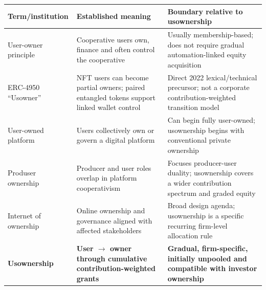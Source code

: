 \begin{tabularx}{\linewidth}{@{}p{.20\linewidth}p{.28\linewidth}X@{}}
\toprule
Term/institution & Established meaning & Boundary relative to usownership \\
\midrule
User-owner principle & Cooperative users own, finance and often control the cooperative \citep{dunn1988} & Usually membership-based; does not require gradual automation-linked equity acquisition \\
ERC-4950 ``Usowner'' & NFT users can become partial owners; paired entangled tokens support linked wallet control \citep{erc4950} & Direct 2022 lexical/technical precursor; not a corporate contribution-weighted transition model \\
User-owned platform & Users collectively own or govern a digital platform & Can begin fully user-owned; usownership begins with conventional private ownership \\
Produser ownership & Producer and user roles overlap in platform cooperativism \citep{scholz2016} & Focuses producer-user duality; usownership covers a wider contribution spectrum and graded equity \\
Internet of ownership & Online ownership and governance aligned with affected stakeholders \citep{schneider2018} & Broad design agenda; usownership is a specific recurring firm-level allocation rule \\
\textbf{Usownership} & \textbf{User $\rightarrow$ owner through cumulative contribution-weighted grants} & \textbf{Gradual, firm-specific, initially unpooled and compatible with investor ownership} \\
\bottomrule
\end{tabularx}
